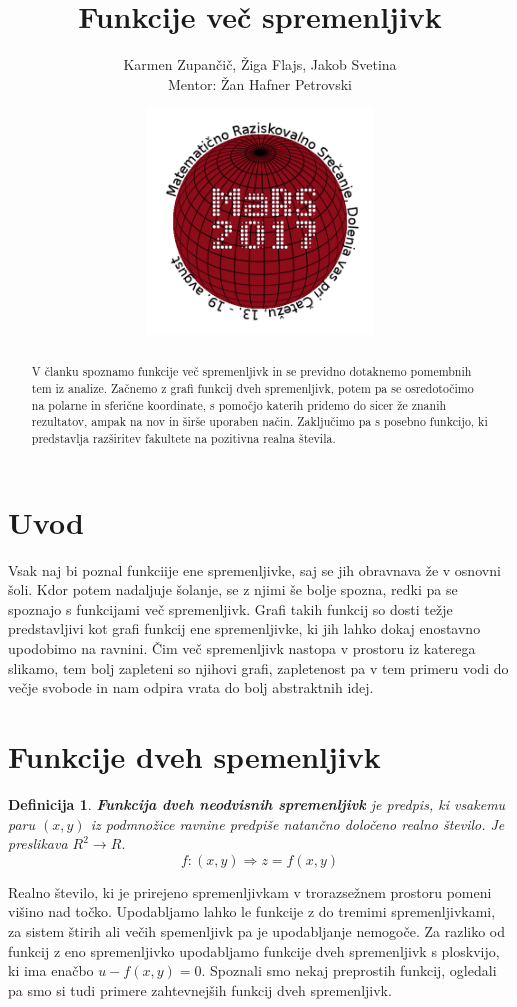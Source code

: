 \documentclass[12pt, a4paper]{article}
\title{Funkcije več spremenljivk}
\author{Karmen Zupančič, Žiga Flajs, Jakob Svetina \\ Mentor: Žan Hafner Petrovski}
\date{\includegraphics[width = 6cm]{logo_MaRS2017.png}}
\newtheorem{definicija}{Definicija}
\begin{document}
\maketitle

\begin{abstract}
V članku spoznamo funkcije več spremenljivk in se previdno dotaknemo pomembnih tem iz analize. Začnemo z grafi funkcij dveh spremenljivk, potem pa se osredotočimo na polarne in sferične koordinate, s pomočjo katerih pridemo do sicer že znanih rezultatov, ampak na nov in širše uporaben način. Zaključimo pa s posebno funkcijo, ki predstavlja razširitev fakultete na pozitivna realna števila.
\end{abstract}

\section{Uvod}
Vsak naj bi poznal funkciije ene spremenljivke, saj se jih obravnava že v osnovni šoli. Kdor potem nadaljuje šolanje, se z njimi še bolje spozna, redki pa se spoznajo s funkcijami več spremenljivk. Grafi takih funkcij so dosti težje predstavljivi kot grafi funkcij ene spremenljivke, ki jih lahko dokaj enostavno upodobimo na ravnini. Čim več spremenljivk nastopa v prostoru iz katerega slikamo, tem bolj zapleteni so njihovi grafi, zapletenost pa v tem primeru vodi do večje svobode in nam odpira vrata do bolj abstraktnih idej.

\section{Funkcije dveh spemenljivk}

\begin{definicija}
\textbf{Funkcija dveh neodvisnih spremenljivk} je predpis, ki vsakemu paru $(x,y)$ iz podmnožice ravnine predpiše natančno določeno realno število.
Je preslikava $R^2 \rightarrow R$.
$$f:(x,y) \Rightarrow z=f(x,y)$$

\end{definicija}

Realno število, ki je prirejeno spremenljivkam v trorazsežnem prostoru pomeni višino nad točko. Upodabljamo lahko le funkcije z do tremimi spremenljivkami, za sistem štirih ali večih spemenljivk pa je upodabljanje nemogoče. Za razliko od funkcij z eno spremenljivko upodabljamo funkcije dveh spremenljivk s ploskvijo, ki ima enačbo $u-f(x,y)=0$. Spoznali smo nekaj preprostih funkcij, ogledali pa smo si tudi primere zahtevnejših funkcij dveh spremenljivk.
\end{document}
